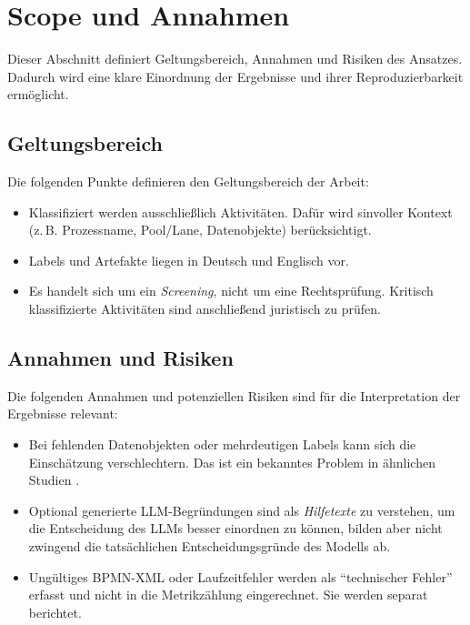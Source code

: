 \section{Scope und Annahmen}\label{sec:scope-und-annahmen}

Dieser Abschnitt definiert Geltungsbereich, Annahmen und Risiken des Ansatzes. Dadurch wird eine klare Einordnung der Ergebnisse und ihrer Reproduzierbarkeit ermöglicht.

\subsection*{Geltungsbereich}

Die folgenden Punkte definieren den Geltungsbereich der Arbeit:

\begin{itemize}
    \item Klassifiziert werden ausschließlich Aktivitäten. Dafür wird sinvoller Kontext (z.\,B. Prozessname, Pool/Lane, Datenobjekte) berücksichtigt.
    \item Labels und Artefakte liegen in Deutsch und Englisch vor.
    \item Es handelt sich um ein \emph{Screening}, nicht um eine Rechtsprüfung. Kritisch klassifizierte Aktivitäten sind anschließend juristisch zu prüfen.
\end{itemize}

\subsection*{Annahmen und Risiken}

Die folgenden Annahmen und potenziellen Risiken sind für die Interpretation der Ergebnisse relevant:

\begin{itemize}
    \item Bei fehlenden Datenobjekten oder mehrdeutigen Labels kann sich die Einschätzung verschlechtern. Das ist ein bekanntes Problem in ähnlichen Studien \cite{nake2023towards}.
    \item Optional generierte \ac{LLM}-Begründungen sind als \emph{Hilfetexte} zu verstehen, um die Entscheidung des \acp{LLM} besser einordnen zu können, bilden aber nicht zwingend die tatsächlichen Entscheidungsgründe des Modells ab.
    \item Ungültiges \ac{BPMN}-XML oder Laufzeitfehler werden als \enquote{technischer Fehler} erfasst und nicht in die Metrikzählung eingerechnet. Sie werden separat berichtet.
\end{itemize}